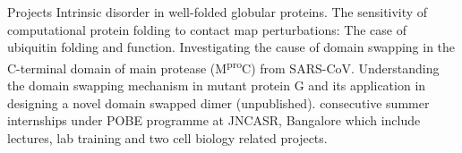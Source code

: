 \begin{rubric}{Projects}
\entry*Intrinsic disorder in well-folded globular proteins.
%
\entry*The sensitivity of computational protein folding to contact map perturbations: The case of ubiquitin folding and function.
%
\entry*Investigating the cause of domain swapping in the C-terminal domain of main protease (M\textsuperscript{pro}C) from SARS-CoV.
%
\entry*Understanding the domain swapping mechanism in mutant protein G and its application in designing a novel domain swapped dimer (unpublished).
 consecutive summer internships under POBE programme at JNCASR, Bangalore which include lectures, lab training and two cell biology related projects.

\end{rubric}